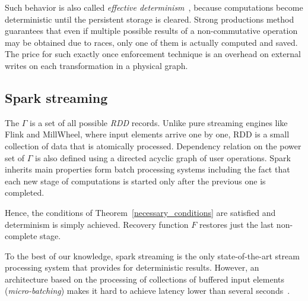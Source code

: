 Such behavior is also called {\em effective determinism}~\cite{akidau2018streaming}, because computations become deterministic until the persistent storage is cleared. Strong productions method guarantees that even if multiple possible results of a non-commutative operation may be obtained due to races, only one of them is actually computed and saved. The price for such exactly once enforcement technique is an overhead on external writes on each transformation in a physical graph.

\subsection{Spark streaming}

The  $\Gamma$ is a set of all possible {\em RDD} records. Unlike pure streaming engines like Flink and MillWheel, where input elements arrive one by one, RDD is a small collection of data that is atomically processed. Dependency relation on the power set of $\Gamma$ is also defined using a directed acyclic graph of user operations. Spark inherits main properties form batch processing systems including the fact that each new stage of computations is started only after the previous one is completed. 

Hence, the conditions of Theorem~\ref{necessary_conditions} are satisfied and determinism is simply achieved. Recovery function $F$ restores just the last non-complete stage.
 
To the best of our knowledge, spark streaming is the only state-of-the-art stream processing system that provides for deterministic results. However, an architecture based on the processing of collections of buffered input elements ({\em micro-batching}) makes it hard to achieve latency lower than several seconds~\cite{7530084, 7474816}. 



